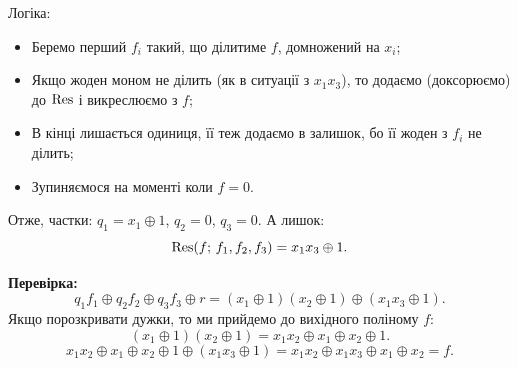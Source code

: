 Логіка:
\begin{itemize}
    \item Беремо перший $f_i$ такий, що ділитиме $f$, домножений на $x_{i}$;
    \item Якщо жоден моном не ділить (як в ситуації з $x_1 x_3$), то додаємо (доксорюємо) до $\mathrm{Res}$ і викреслюємо з $f$;
    \item В кінці лишається одиниця, її теж додаємо в залишок, бо її жоден з $f_{i}$ не ділить;
    \item Зупиняємося на моменті коли $f = 0$.
\end{itemize}

Отже, частки: $q_1 = x_1 \oplus 1$, \; $q_2 = 0$, \; $q_3 = 0$. А лишок:
\begin{equation*}
    \mathrm{Res}(f;\, f_1, f_2, f_3) = x_1 x_3 \oplus 1.
\end{equation*}

\noindent \textbf{Перевірка:}
\begin{equation*}
    q_1 f_1 \oplus q_2 f_2 \oplus q_3 f_3 \oplus r
    = (x_1 \oplus 1)(x_2 \oplus 1) \oplus (x_1 x_3 \oplus 1).
\end{equation*}
Якщо порозкривати дужки, то ми прийдемо до вихідного поліному $f$:
\begin{equation*}
    (x_1 \oplus 1)(x_2 \oplus 1) = x_1 x_2 \oplus x_1 \oplus x_2 \oplus 1.
\end{equation*}
\begin{equation*}
    x_1 x_2 \oplus x_1 \oplus x_2 \oplus 1 \oplus (x_1 x_3 \oplus 1)
    = x_1 x_2 \oplus x_1 x_3 \oplus x_1 \oplus x_2 = f.
\end{equation*}
